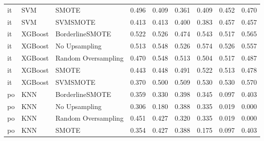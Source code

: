 \begin{tabular}{lllllllll}
      it &                          SVM &               SMOTE &     0.496 &                     0.409 &                 0.361 &                  0.409 &                                   0.452 &     0.470 \\
      it &                          SVM &            SVMSMOTE &     0.413 &                     0.413 &                 0.400 &                  0.383 &                                   0.457 &     0.457 \\
      it &                      XGBoost &     BorderlineSMOTE &     0.522 &                     0.526 &                 0.474 &                  0.543 &                                   0.517 &     0.565 \\
      it &                      XGBoost &       No Upsampling &     0.513 &                     0.548 &                 0.526 &                  0.574 &                                   0.526 &     0.557 \\
      it &                      XGBoost & Random Oversampling &     0.470 &                     0.548 &                 0.513 &                  0.504 &                                   0.517 &     0.487 \\
      it &                      XGBoost &               SMOTE &     0.443 &                     0.448 &                 0.491 &                  0.522 &                                   0.513 &     0.478 \\
      it &                      XGBoost &            SVMSMOTE &     0.370 &                     0.500 &                 0.509 &                  0.530 &                                   0.530 &     0.570 \\
      po &                          KNN &     BorderlineSMOTE &     0.359 &                     0.330 &                 0.398 &                  0.345 &                                   0.097 &     0.403 \\
      po &                          KNN &       No Upsampling &     0.306 &                     0.180 &                 0.388 &                  0.335 &                                   0.019 &     0.000 \\
      po &                          KNN & Random Oversampling &     0.451 &                     0.427 &                 0.320 &                  0.335 &                                   0.019 &     0.000 \\
      po &                          KNN &               SMOTE &     0.354 &                     0.427 &                 0.388 &                  0.175 &                                   0.097 &     0.403 \\

\end{tabular}
